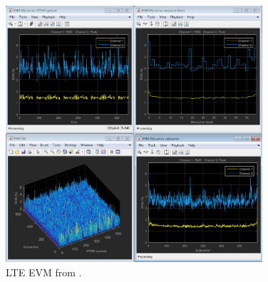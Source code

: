 \begin{figure}[htbp]
    \centering
    \includegraphics[width=0.85\textwidth]{./figures/evm}
    \caption{ LTE EVM from \cite{web:lteexamplewiki}.
    \label{fig:lteevmiio}}
\end{figure}

\vfill
\clearpage
